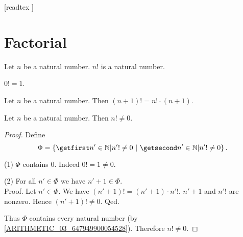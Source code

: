 \documentclass[10pt]{article}
\begin{document}
  \begin{imports}
    \begin{forthel}
      [readtex ]
    \end{forthel}
  \end{imports}


  \section{Factorial}

  \begin{forthel}
    \begin{signature}
      Let $n$ be a natural number.
      $n!$ is a natural number.
    \end{signature}
  \end{forthel}

  \begin{forthel}
    \begin{axiom}
      $0! = 1$.
    \end{axiom}
  \end{forthel}

  \begin{forthel}
    \begin{axiom}
      Let $n$ be a natural number.
      Then $(n + 1)! = n! \cdot (n + 1)$.
    \end{axiom}
  \end{forthel}

  \begin{forthel}
    \begin{proposition}
      Let $n$ be a natural number.
      Then $n! \neq 0$.
    \end{proposition}
    \begin{proof}
      Define \[ \Phi = \class{n' \in \Nat | n'! \neq 0}. \]

      (1) $\Phi$ contains $0$.
      Indeed $0! = 1 \neq 0$.

      (2) For all $n' \in \Phi$ we have $n' + 1 \in \Phi$. \\
      Proof.
        Let $n' \in \Phi$.
        We have $(n' + 1)! = (n' + 1) \cdot n'!$.
        $n' + 1$ and $n'!$ are nonzero.
        Hence $(n' + 1)! \neq 0$.
      Qed.

      Thus $\Phi$ contains every natural number (by \cref{ARITHMETIC_03_647949900054528}).
      Therefore $n! \neq 0$.
    \end{proof}
  \end{forthel}
\end{document}
